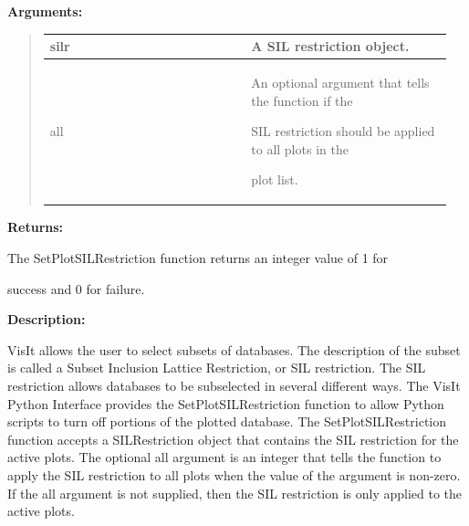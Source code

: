 \documentclass[letterpaper,10pt,english]{sphinxmanual}
\begin{document}
\begin{DUlineblock}{0em}
\item[] 
\item[] \textbf{Arguments:}
\end{DUlineblock}
\begin{quote}

\begin{tabular}{|p{0.475\linewidth}|p{0.475\linewidth}|}
\hline

silr
 & 
A SIL restriction object.
\\
\hline
all
 & 
\begin{DUlineblock}{0em}
\item[] An optional argument that tells the function if the
\item[] SIL restriction should be applied to all plots in the
\item[] plot list.
\end{DUlineblock}
\\
\hline\end{tabular}

\end{quote}

\begin{DUlineblock}{0em}
\item[] 
\item[] \textbf{Returns:}
\item[] The SetPlotSILRestriction function returns an integer value of 1 for
\item[] success and 0 for failure.
\item[] 
\item[] \textbf{Description:}
\item[] VisIt allows the user to select subsets of databases. The description of
the subset is called a Subset Inclusion Lattice Restriction, or SIL
restriction. The SIL restriction allows databases to be subselected in
several different ways. The VisIt Python Interface provides the
SetPlotSILRestriction function to allow Python scripts to turn off portions
of the plotted database. The SetPlotSILRestriction function accepts a
SILRestriction object that contains the SIL restriction for the active
plots. The optional all argument is an integer that tells the function to
apply the SIL restriction to all plots when the value of the argument is
non-zero. If the all argument is not supplied, then the SIL restriction is
only applied to the active plots.
\end{DUlineblock}

\begin{DUlineblock}{0em}
\item[] 
\end{DUlineblock}
\end{document}
